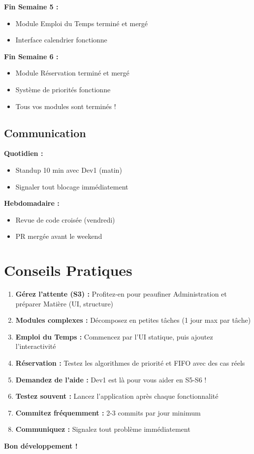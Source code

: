 \documentclass[11pt,a4paper]{article}
\begin{document}
\textbf{Fin Semaine 5 :}
\begin{itemize}
    \item[$\square$] Module Emploi du Temps terminé et mergé
    \item[$\square$] Interface calendrier fonctionne
\end{itemize}

\textbf{Fin Semaine 6 :}
\begin{itemize}
    \item[$\square$] Module Réservation terminé et mergé
    \item[$\square$] Système de priorités fonctionne
    \item[$\square$] Tous vos modules sont terminés !
\end{itemize}

\subsection{Communication}

\textbf{Quotidien :}
\begin{itemize}
    \item[$\square$] Standup 10 min avec Dev1 (matin)
    \item[$\square$] Signaler tout blocage immédiatement
\end{itemize}

\textbf{Hebdomadaire :}
\begin{itemize}
    \item[$\square$] Revue de code croisée (vendredi)
    \item[$\square$] PR mergée avant le weekend
\end{itemize}

\section{Conseils Pratiques}

\begin{enumerate}
    \item \textbf{Gérez l'attente (S3) :} Profitez-en pour peaufiner Administration et préparer Matière (UI, structure)
    \item \textbf{Modules complexes :} Décomposez en petites tâches (1 jour max par tâche)
    \item \textbf{Emploi du Temps :} Commencez par l'UI statique, puis ajoutez l'interactivité
    \item \textbf{Réservation :} Testez les algorithmes de priorité et FIFO avec des cas réels
    \item \textbf{Demandez de l'aide :} Dev1 est là pour vous aider en S5-S6 !
    \item \textbf{Testez souvent :} Lancez l'application après chaque fonctionnalité
    \item \textbf{Commitez fréquemment :} 2-3 commits par jour minimum
    \item \textbf{Communiquez :} Signalez tout problème immédiatement
\end{enumerate}

\textbf{Bon développement ! 🚀}
\end{document}
